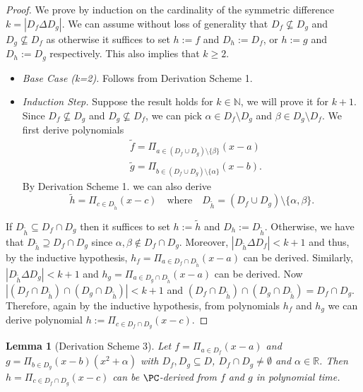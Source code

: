 \documentclass[11pt]{article}
\newtheorem{lemma}[theorem]{Lemma}
\begin{document}
\begin{proof}
    We prove by induction on the cardinality of the symmetric difference $k = |D_f \Delta D_g|$. We can assume without loss of generality that $D_f \nsubseteq D_g$ and $D_g \nsubseteq D_f$ as otherwise it suffices to set $h := f$ and $D_h := D_f$, or $h := g$ and $D_h := D_g$ respectively. This also implies that $k \geq 2$.
    \begin{itemize}
        \item \textit{Base Case (k=2).} Follows from Derivation Scheme 1.
        \item \textit{Induction Step.} Suppose the result holds for $k \in \mathbb{N}$, we will prove it for $k+1$. Since $D_f \nsubseteq D_g$ and $D_g \nsubseteq D_f$, we can pick $\alpha \in D_f \setminus D_g$ and $\beta \in D_g \setminus D_f$. We first derive polynomials
        \begin{align*}
            &\tilde{f} = \Pi_{a \in (D_f \cup D_g) \setminus \{\beta\}} (x-a)\\
            &\tilde{g} = \Pi_{b \in (D_f \cup D_g) \setminus \{ \alpha \} } (x-b).
        \end{align*}
        By Derivation Scheme 1. we can also derive
        \begin{equation*}
            \tilde{h} = \Pi_{c \in D_{\tilde{h}}} (x-c) \quad \text{where} \quad D_{\tilde{h}} = (D_f \cup D_g) \setminus \{\alpha,\beta\}.
        \end{equation*}
    \end{itemize}
    If $D_{\tilde{h}} \subseteq D_f \cap D_g$ then it suffices to set $h := \tilde{h}$ and $D_h := D_{\tilde{h}}$. Otherwise, we have that $D_{\tilde{h}} \supseteq D_f \cap D_g$ since $\alpha,\beta \notin D_f \cap D_g$. Moreover, $|D_{\tilde{h}} \Delta D_f| < k+1$ and thus, by the inductive hypothesis, $h_f = \Pi_{a \in D_f \cap D_{\tilde{h}}}(x-a)$ can be derived. Similarly, $|D_{\tilde{h}} \Delta D_g| < k+1$ and $h_g = \Pi_{a \in D_g \cap D_{\tilde{h}}}(x-a)$ can be derived. Now $|(D_f \cap D_{\tilde{h}}) \cap (D_g \cap D_{\tilde{h}})| < k+1$ and $(D_f \cap D_{\tilde{h}}) \cap (D_g \cap D_{\tilde{h}}) = D_f \cap D_g$. Therefore, again by the inductive hypothesis, from polynomials $h_f$ and $h_g$ we can derive polynomial $h := \Pi_{c \in D_f \cap D_g}(x-c)$.
\end{proof}

\begin{lemma}[Derivation Scheme 3]
    Let $f = \Pi_{a \in D_f} (x-a)$ and $g = \Pi_{b \in D_g}(x-b)(x^2 + \alpha)$ with $D_f, D_g \subseteq D$, $D_f \cap D_g \neq \emptyset$ and $\alpha \in \mathbb{R}$. Then $h = \Pi_{c \in D_f \cap D_g}(x-c)$ can be $\PC$-derived from $f$ and $g$ in polynomial time.
\end{lemma}
\end{document}
